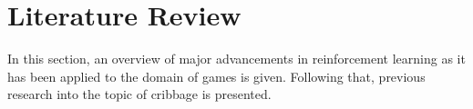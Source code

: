\section{Literature Review}
\label{sec:lit}

In this section,
an overview of major advancements in reinforcement learning
as it has been applied to the domain of games is given.
%
Following that,
previous research into the topic of cribbage is presented.





